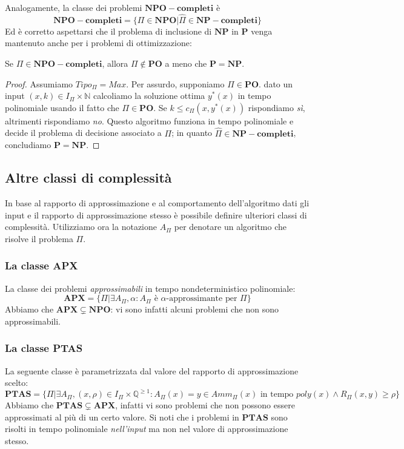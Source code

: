\noindent
Analogamente, la classe dei problemi $\mathbf{NPO-completi}$ è 
$$
\mathbf{NPO-completi} = \{\Pi \in \mathbf{NPO} | \hat{\Pi} \in \mathbf{NP-completi}\}
$$
Ed è corretto aspettarsi che il problema di inclusione di $\mathbf{NP}$ in $\mathbf{P}$ 
venga mantenuto anche per i problemi di ottimizzazione:
\begin{theorem}
  Se $\Pi \in \mathbf{NPO-completi}$, allora $\Pi \notin \mathbf{PO}$ a meno che
$\mathbf{P} = \mathbf{NP}$.
\end{theorem}

\begin{proof}
Assumiamo $Tipo_{\Pi} = Max$. Per assurdo, supponiamo $\Pi \in \mathbf{PO}$. 
dato un input $(x,k) \in I_{\Pi} \times \mathbb{N}$ calcoliamo la soluzione ottima 
$y^*(x)$ in tempo polinomiale usando il fatto che $\Pi \in \mathbf{PO}$. 
Se $k \leq c_{\Pi}(x, y^*(x))$ 
rispondiamo \textit{sì}, altrimenti rispondiamo \textit{no}. Questo algoritmo funziona in 
tempo polinomiale e decide il problema di decisione associato a $\Pi$; 
in quanto $\hat{\Pi} \in \mathbf{NP-completi}$, concludiamo $\mathbf{P} = \mathbf{NP}$.
\end{proof}

\subsection{Altre classi di complessità}
In base al rapporto di approssimazione e al comportamento 
dell'algoritmo dati gli input e il rapporto di approssimazione stesso è 
possibile definire ulteriori classi di complessità. Utilizziamo ora 
la notazione $A_{\Pi}$ per denotare un algoritmo che risolve il problema 
$\Pi$.

\subsubsection{La classe \textbf{APX}}
La classe dei problemi \textit{approssimabili} in tempo nondeterministico polinomiale:
$$
\mathbf{APX} = \{\Pi | \exists A_{\Pi}, \alpha: A_{\Pi} \text{ è } \alpha\text{-approssimante per } \Pi\}
$$
Abbiamo che $\mathbf{APX} \subsetneq \mathbf{NPO}$: vi sono infatti alcuni 
problemi che non sono approssimabili. 

\subsubsection{La classe {\bf PTAS}}
La seguente classe è parametrizzata dal valore del rapporto di approssimazione 
scelto:
$$
\mathbf{PTAS} = \{\Pi | \exists A_{\Pi},  (x, \rho) \in I_{\Pi} \times \mathbb{Q}^{\geq 1}:
A_{\Pi}(x) = y \in Amm_{\Pi}(x) \text{ in tempo } poly(x) \land R_{\Pi}(x,y) \geq \rho \} 
$$
Abbiamo che  $\mathbf{PTAS} \subsetneq \mathbf{APX}$, infatti vi sono problemi 
che non possono essere approssimati al più di un certo valore. Si noti che 
i problemi in $\mathbf{PTAS}$ sono risolti in tempo polinomiale \textit{nell'input} ma 
non nel valore di approssimazione stesso. 
